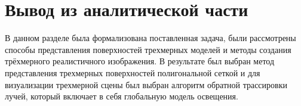 \section*{Вывод из аналитической части}
В данном разделе была формализована поставленная задача, были рассмотрены способы представления поверхностей трехмерных моделей и методы создания трёхмерного реалистичного изображения. В результате был выбран метод представления трехмерных поверхностей полигональной сеткой и для визуализации трехмерной сцены был выбран алгоритм обратной трассировки лучей, который включает в себя глобальную модель освещения.

\clearpage
